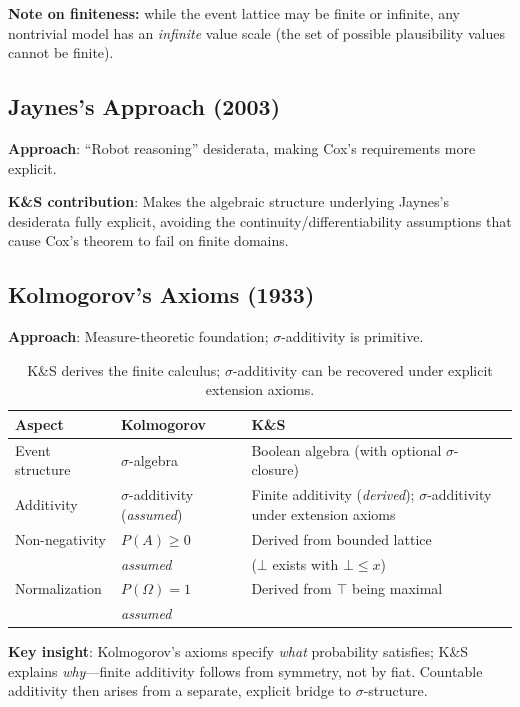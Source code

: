 \documentclass[11pt]{article}
\begin{document}
\textbf{Note on finiteness:} while the event lattice may be finite or infinite, any nontrivial model has an
\emph{infinite} value scale (the set of possible plausibility values cannot be finite).

\subsection{Jaynes's Approach (2003)}

\textbf{Approach}: ``Robot reasoning'' desiderata, making Cox's requirements more explicit.

\textbf{K\&S contribution}: Makes the algebraic structure underlying Jaynes's desiderata fully explicit,
avoiding the continuity/differentiability assumptions that cause Cox's theorem to fail on finite domains.

\subsection{Kolmogorov's Axioms (1933)}

\textbf{Approach}: Measure-theoretic foundation; $\sigma$-additivity is primitive.

\begin{table}[h]
\centering
\small
\begin{tabular}{lll}
\toprule
\textbf{Aspect} & \textbf{Kolmogorov} & \textbf{K\&S} \\
\midrule
Event structure & $\sigma$-algebra & Boolean algebra (with optional $\sigma$-closure) \\[3pt]
Additivity & $\sigma$-additivity (\emph{assumed}) &
Finite additivity (\emph{derived}); $\sigma$-additivity under extension axioms \\[3pt]
Non-negativity & $P(A) \geq 0$ & Derived from bounded lattice \\
               & \emph{assumed} & ($\bot$ exists with $\bot \leq x$) \\[3pt]
Normalization & $P(\Omega) = 1$ & Derived from $\top$ being maximal \\
              & \emph{assumed} & \\
\bottomrule
\end{tabular}
\caption{K\&S derives the finite calculus; $\sigma$-additivity can be recovered under explicit extension axioms.}
\end{table}

\textbf{Key insight}: Kolmogorov's axioms specify \emph{what} probability satisfies;
K\&S explains \emph{why}---finite additivity follows from symmetry, not by fiat.
Countable additivity then arises from a separate, explicit bridge to $\sigma$-structure.
\end{document}
